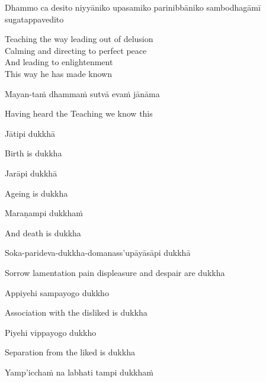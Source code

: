 Dhammo ca desito niyyāniko upasamiko parinibbāniko sambodhagāmī sugatappavedito

\begin{cprenglish}
  Teaching the way leading out of delusion\\
  Calming and directing to perfect peace\\
  And leading to enlightenment\\
  This way he has made known\\
\end{cprenglish}

Mayan-taṁ dhammaṁ sutvā evaṁ jānāma

\begin{cprenglish}
  Having heard the Teaching we know this
\end{cprenglish}

Jātipi dukkhā

\begin{cprenglish}
  Birth is dukkha
\end{cprenglish}

Jarāpi dukkhā

\begin{cprenglish}
  Ageing is dukkha
\end{cprenglish}

Maraṇampi dukkhaṁ

\begin{cprenglish}
  And death is dukkha
\end{cprenglish}

Soka-parideva-dukkha-domanass'upāyāsāpi dukkhā

\begin{cprenglish}
  Sorrow lamentation pain displeasure
  and despair are dukkha
\end{cprenglish}

Appiyehi sampayogo dukkho

\begin{cprenglish}
  Association with the disliked is dukkha
\end{cprenglish}

Piyehi vippayogo dukkho

\begin{cprenglish}
  Separation from the liked is dukkha
\end{cprenglish}

Yamp'icchaṁ na labhati tampi dukkhaṁ

